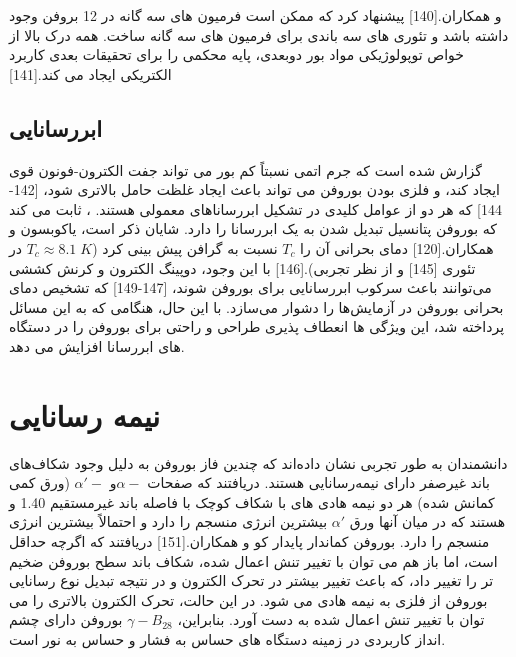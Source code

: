 و همکاران.\cite{ezawaTripletFermionsDirac2017}[140] پیشنهاد کرد که ممکن است فرمیون های سه گانه در 12 بروفن وجود داشته باشد و تئوری های سه باندی برای فرمیون های سه گانه ساخت. همه درک بالا از خواص توپولوژیکی مواد بور دوبعدی، پایه محکمی را برای تحقیقات بعدی کاربرد الکتریکی ایجاد می کند.\cite{fanCatScradlelikeDirac2018}[141]
\subsection{ابررسانایی}
گزارش شده است که جرم اتمی نسبتاً کم بور می تواند جفت الکترون-فونون قوی ایجاد کند، و فلزی بودن بوروفن می تواند باعث ایجاد غلظت حامل بالاتری شود، \cite{kortusSuperconductivityMetallicBoron2001, choiOriginAnomalousSuperconducting2002, anSuperconductivityMgB2Covalent2001}[142-144] که هر دو از عوامل کلیدی در تشکیل ابررساناهای معمولی هستند. ، ثابت می کند که بوروفن پتانسیل تبدیل شدن به یک ابررسانا را دارد. شایان ذکر است، یاکوبسون و همکاران.\cite{penevCanTwoDimensionalBoron2016}[120] دمای بحرانی آن را $T_c$ نسبت به گرافن پیش بینی کرد ($T_c ≈ 8.1\; K$ در تئوری \cite{profetaPhononmediatedSuperconductivityGraphene2012}[145] و  از نظر تجربی).\cite{xueSuperconductivityPotassiumDopedFewLayer2012}[146] با این وجود، دوپینگ الکترون و کرنش کششی می‌توانند باعث سرکوب ابررسانایی برای بوروفن شوند، \cite{chengSuppressedSuperconductivitySubstratesupported2017, xiaoEnhancedSuperconductivityStrain2016}\cite{wuLithiumBoronLiBMonolayers2016}[147-149] که تشخیص دمای بحرانی بوروفن در آزمایش‌ها را دشوار می‌سازد. با این حال، هنگامی که به این مسائل پرداخته شد، این ویژگی ها انعطاف پذیری طراحی و راحتی برای بوروفن را در دستگاه های ابررسانا افزایش می دهد.
\section{نیمه رسانایی}
دانشمندان به طور تجربی نشان داده‌اند که چندین فاز بوروفن به دلیل وجود شکاف‌های باند غیرصفر دارای نیمه‌رسانایی هستند. دریافتند که صفحات $\alpha-$و $\alpha\prime-$ (ورق کمی کمانش شده) هر دو نیمه هادی های با شکاف کوچک با فاصله باند غیرمستقیم 1.40 و  هستند که در میان آنها ورق $\alpha\prime$ بیشترین انرژی منسجم را دارد و احتمالاً بیشترین انرژی منسجم را دارد. بوروفن کماندار پایدار کو و همکاران.\cite{kouHighmobilityAnisotropicTransport2016}[151] دریافتند که اگرچه حداقل است، اما باز هم می توان با تغییر تنش اعمال شده، شکاف باند سطح بوروفن ضخیم تر را تغییر داد، که باعث تغییر بیشتر در تحرک الکترون و در نتیجه تبدیل نوع رسانایی بوروفن از فلزی به نیمه هادی می شود. در این حالت، تحرک الکترون بالاتری را می توان با تغییر تنش اعمال شده به دست آورد. بنابراین، $\gamma-B_28$ بوروفن دارای چشم انداز کاربردی در زمینه دستگاه های حساس به فشار و حساس به نور است.

